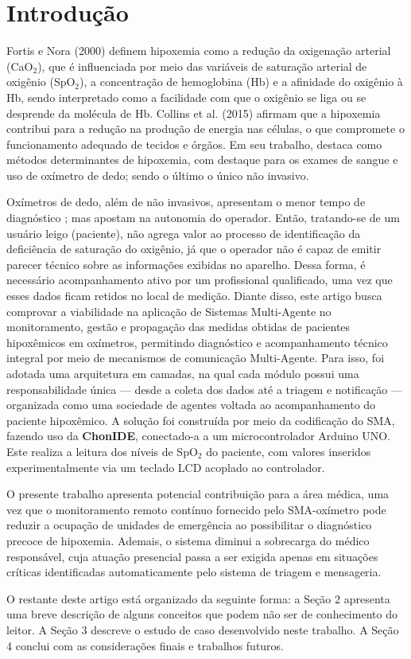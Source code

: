 \section{Introdução}\label{sec:introdução}
Fortis e Nora (2000) \cite{fortis2000hipoxemia} definem hipoxemia como a redução da oxigenação arterial (CaO$_2$), que é influenciada por meio das variáveis de saturação arterial de oxigênio (SpO$_2$), a concentração de hemoglobina (Hb) e a afinidade do oxigênio à Hb, sendo interpretado como a facilidade com que o oxigênio se liga ou se desprende da molécula de Hb. Collins et al. (2015) \cite{collins2015relating} afirmam que a hipoxemia contribui para a  redução na produção de energia nas células, o que compromete o funcionamento adequado de tecidos e órgãos. Em seu trabalho, destaca como métodos determinantes de hipoxemia, com destaque para os exames de sangue e uso de oxímetro de dedo; sendo o último o único não invasivo.

Oxímetros de dedo, além de não invasivos, apresentam o menor tempo de diagnóstico \cite{collins2015relating}; mas apostam na autonomia do operador. Então, tratando-se de um usuário leigo (paciente), não agrega valor ao processo de identificação da deficiência de saturação do oxigênio, já que o operador não é capaz de emitir parecer técnico sobre as informações exibidas no aparelho. Dessa forma, é necessário acompanhamento ativo por um profissional qualificado, uma vez que esses dados ficam retidos no local de medição. Diante disso, este artigo busca comprovar a viabilidade na aplicação de Sistemas Multi-Agente no monitoramento, gestão e propagação das medidas obtidas de pacientes hipoxêmicos em oxímetros, permitindo diagnóstico e acompanhamento técnico integral por meio de mecanismos de comunicação Multi-Agente. Para isso, foi adotada uma arquitetura em camadas, na qual cada módulo possui uma responsabilidade única — desde a coleta dos dados até a triagem e notificação — organizada como uma sociedade de agentes voltada ao acompanhamento do paciente hipoxêmico. A solução foi construída por meio da codificação do SMA, fazendo uso da \textbf{ChonIDE}, conectado-a a um microcontrolador Arduino UNO. Este realiza a leitura dos níveis de SpO$_2$ do paciente, com valores inseridos experimentalmente via um teclado LCD acoplado ao controlador.

O presente trabalho apresenta potencial contribuição para a área médica, uma vez que o monitoramento remoto contínuo fornecido pelo SMA-oxímetro pode reduzir a ocupação de unidades de emergência ao possibilitar o diagnóstico precoce de hipoxemia. Ademais, o sistema diminui a sobrecarga do médico responsável, cuja atuação presencial passa a ser exigida apenas em situações críticas identificadas automaticamente pelo sistema de triagem e mensageria.

O restante deste artigo está organizado da seguinte forma: a Seção 2 apresenta uma breve descrição de alguns conceitos que podem não ser de conhecimento do leitor. A Seção 3 descreve o estudo de caso desenvolvido neste trabalho. A Seção 4 conclui com as considerações finais e trabalhos futuros.